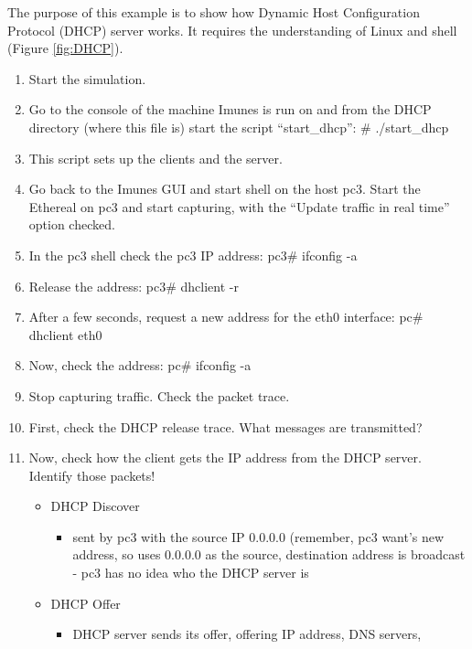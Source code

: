 The purpose of this example is to show how Dynamic Host Configuration Protocol
(DHCP) server works. It requires the understanding of Linux and shell (Figure
\ref{fig:DHCP}).


\begin{enumerate}
 \item	Start the simulation.
 \item	Go to the console of the machine Imunes is run on and from the DHCP
directory (where this file is) start the script ``start\_dhcp'': \#
./start\_dhcp
 \item	This script sets up the clients and the server.
 \item	Go back to the Imunes GUI and start shell on the host pc3. Start the
Ethereal on pc3 and start capturing, with the ``Update traffic in real time''
option checked.
 \item	In the pc3 shell check the pc3 IP address: pc3\# ifconfig -a
 \item	Release the address: pc3\# dhclient -r
 \item  After a few seconds, request a new address for the eth0 interface: pc\#
dhclient eth0
 \item	Now, check the address: pc\# ifconfig -a
 \item	Stop capturing traffic. Check the packet trace.
 \item	First, check the DHCP release trace. What messages are transmitted?
 \item	Now, check how the client gets the IP address from the DHCP server.
Identify those packets!
  \begin{itemize}
    \item	DHCP Discover
      \begin{itemize}
	\item	sent by pc3 with the source IP 0.0.0.0 (remember, pc3 want's
new address, so uses 0.0.0.0 as the source, destination address is broadcast -
pc3 has no idea who the DHCP server is
      \end{itemize}
    \item	DHCP Offer
      \begin{itemize}
	\item	DHCP server sends its offer, offering IP address, DNS servers,

\end{itemize}
\end{itemize}
\end{enumerate}

